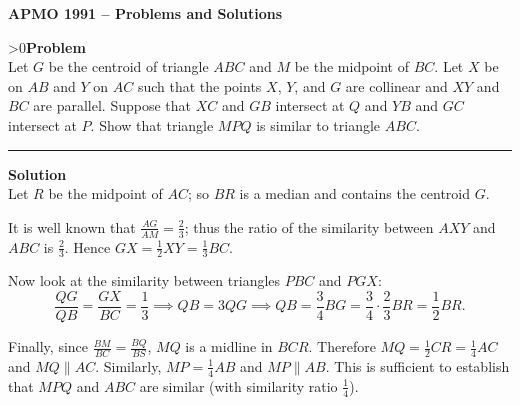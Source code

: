 \documentclass[12pt,oneside,a4paper]{book}
\newcounter{probnum}
\newcounter{solnum}
\newcommand{\prob}{\ifnum\value{probnum}>0\newpage\fi\setcounter{solnum}{0}\stepcounter{probnum}\textbf{Problem \theprobnum}\\}
\newcommand{\soln}{\stepcounter{solnum}\medskip\hrule\medbreak\textbf{Solution \thesolnum}\\}
\begin{document}
\begin{center}
\textbf{\large APMO 1991 -- Problems and Solutions}
\end{center}

\prob Let $G$ be the centroid of triangle $ABC$ and $M$ be the midpoint of $BC$. Let $X$ be on $AB$ and $Y$ on $AC$ such that the points $X$, $Y$, and $G$ are collinear and $XY$ and $BC$ are parallel. Suppose that $XC$ and $GB$ intersect at $Q$ and $YB$ and $GC$ intersect at $P$. Show that triangle $MPQ$ is similar to triangle $ABC$.

\soln
Let $R$ be the midpoint of $AC$; so $BR$ is a median and contains the centroid $G$.

\begin{center}
\end{center}

It is well known that $\frac{AG}{AM} = \frac23$; thus the ratio of the similarity between $AXY$ and $ABC$ is $\frac23$. Hence $GX = \frac12XY = \frac 13BC$.

Now look at the similarity between triangles $PBC$ and $PGX$:
\[\frac{QG}{QB} = \frac{GX}{BC} = \frac13 \implies QB = 3QG \implies QB = \frac34BG = \frac34\cdot\frac23BR = \frac12BR.\]

Finally, since $\frac{BM}{BC} = \frac{BQ}{BS}$, $MQ$ is a midline in $BCR$. Therefore $MQ = \frac12CR = \frac14AC$ and $MQ\parallel AC$. Similarly, $MP = \frac14AB$ and $MP\parallel AB$. This is sufficient to establish that $MPQ$ and $ABC$ are similar (with similarity ratio $\frac14$).
\end{document}
